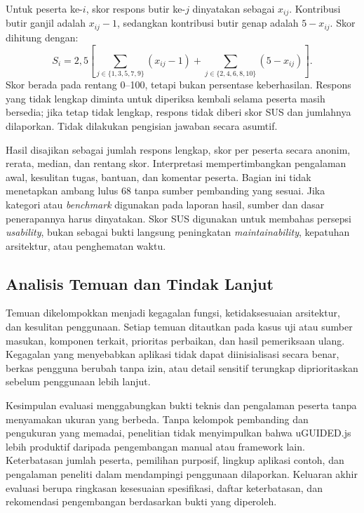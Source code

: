 \documentclass[12pt,a4paper,oneside]{report}
\begin{document}
Untuk peserta ke-$i$, skor respons butir ke-$j$ dinyatakan sebagai $x_{ij}$. Kontribusi butir ganjil adalah $x_{ij}-1$, sedangkan kontribusi butir genap adalah $5-x_{ij}$. Skor dihitung dengan:
\begin{equation}
S_i=2{,}5\left[\sum_{j\in\{1,3,5,7,9\}}(x_{ij}-1)
+\sum_{j\in\{2,4,6,8,10\}}(5-x_{ij})\right].
\label{eq:sus_score}
\end{equation}
Skor berada pada rentang 0--100, tetapi bukan persentase keberhasilan. Respons yang tidak lengkap diminta untuk diperiksa kembali selama peserta masih bersedia; jika tetap tidak lengkap, respons tidak diberi skor SUS dan jumlahnya dilaporkan. Tidak dilakukan pengisian jawaban secara asumtif.

Hasil disajikan sebagai jumlah respons lengkap, skor per peserta secara anonim, rerata, median, dan rentang skor. Interpretasi mempertimbangkan pengalaman awal, kesulitan tugas, bantuan, dan komentar peserta. Bagian ini tidak menetapkan ambang lulus 68 tanpa sumber pembanding yang sesuai. Jika kategori atau \textit{benchmark} digunakan pada laporan hasil, sumber dan dasar penerapannya harus dinyatakan. Skor SUS digunakan untuk membahas persepsi \textit{usability}, bukan sebagai bukti langsung peningkatan \textit{maintainability}, kepatuhan arsitektur, atau penghematan waktu.

\subsection{Analisis Temuan dan Tindak Lanjut}
Temuan dikelompokkan menjadi kegagalan fungsi, ketidaksesuaian arsitektur, dan kesulitan penggunaan. Setiap temuan ditautkan pada kasus uji atau sumber masukan, komponen terkait, prioritas perbaikan, dan hasil pemeriksaan ulang. Kegagalan yang menyebabkan aplikasi tidak dapat diinisialisasi secara benar, berkas pengguna berubah tanpa izin, atau detail sensitif terungkap diprioritaskan sebelum penggunaan lebih lanjut.

Kesimpulan evaluasi menggabungkan bukti teknis dan pengalaman peserta tanpa menyamakan ukuran yang berbeda. Tanpa kelompok pembanding dan pengukuran yang memadai, penelitian tidak menyimpulkan bahwa uGUIDED.js lebih produktif daripada pengembangan manual atau framework lain. Keterbatasan jumlah peserta, pemilihan purposif, lingkup aplikasi contoh, dan pengalaman peneliti dalam mendampingi penggunaan dilaporkan. Keluaran akhir evaluasi berupa ringkasan kesesuaian spesifikasi, daftar keterbatasan, dan rekomendasi pengembangan berdasarkan bukti yang diperoleh.
\end{document}
